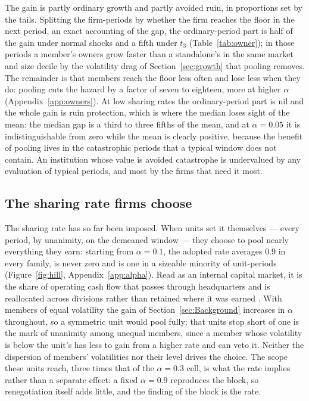 


The gain is partly ordinary growth and partly avoided ruin, in proportions set by the tails. Splitting the firm-periods by whether the firm reaches the floor in the next period, an exact accounting of the gap, the ordinary-period part is half of the gain under normal shocks and a fifth under $t_3$ (Table~\ref{tab:owner}); in those periods a member's owners grow faster than a standalone's in the same market and size decile by the volatility drag of Section~\ref{sec:growth} that pooling removes. The remainder is that members reach the floor less often and lose less when they do: pooling cuts the hazard by a factor of seven to eighteen, more at higher $\alpha$ (Appendix~\ref{app:owners}). At low sharing rates the ordinary-period part is nil and the whole gain is ruin protection, which is where the median loses sight of the mean: the median gap is a third to three fifths of the mean, and at $\alpha = 0.05$ it is indistinguishable from zero while the mean is clearly positive, because the benefit of pooling lives in the catastrophic periods that a typical window does not contain. An institution whose value is avoided catastrophe is undervalued by any evaluation of typical periods, and most by the firms that need it most.

\subsection{The sharing rate firms choose}\label{sec:results-alpha}

The sharing rate has so far been imposed. When units set it themselves --- every period, by unanimity, on the demeaned window --- they choose to pool nearly everything they earn: starting from $\alpha = 0.1$, the adopted rate averages 0.9 in every family, is never zero and is one in a sizeable minority of unit-periods (Figure~\ref{fig:hill}, Appendix~\ref{app:alpha}). Read as an internal capital market, it is the share of operating cash flow that passes through headquarters and is reallocated across divisions rather than retained where it was earned \citep{stein1997internal, lamont1997cash}. With members of equal volatility the gain of Section~\ref{sec:Background} increases in $\alpha$ throughout, so a symmetric unit would pool fully; that units stop short of one is the mark of unanimity among unequal members, since a member whose volatility is below the unit's has less to gain from a higher rate and can veto it. Neither the dispersion of members' volatilities nor their level drives the choice. The scope these units reach, three times that of the $\alpha = 0.3$ cell, is what the rate implies rather than a separate effect: a fixed $\alpha = 0.9$ reproduces the block, so renegotiation itself adds little, and the finding of the block is the rate.

